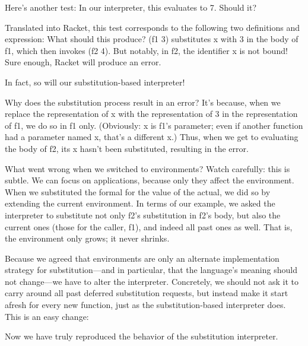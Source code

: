 
Here’s another test:
In our interpreter, this evaluates to 7. Should it?

Translated into Racket, this test corresponds to the following two definitions
and expression:
What should this produce? (f1 3) substitutes x with 3 in the body of f1, which
then invokes (f2 4). But notably, in f2, the identifier x is not bound! Sure
enough, Racket will produce an error.

In fact, so will our substitution-based interpreter!

Why does the substitution process result in an error? It’s because, when we
replace the representation of x with the representation of 3 in the
representation of f1, we do so in f1 only.
(Obviously: x is f1’s parameter; even if another function had a parameter named
x, that’s a different x.) Thus, when we get to evaluating the body of f2, its x
hasn’t been substituted, resulting in the error.

What went wrong when we switched to environments? Watch carefully: this is
subtle. We can focus on applications, because only they affect the environment.
When we substituted the formal for the value of the actual, we did so by
extending the current environment. In terms of our example, we asked the
interpreter to substitute not only f2’s substitution in f2’s body, but also the
current ones (those for the caller, f1), and indeed all past ones as well. That
is, the environment only grows; it never shrinks.

Because we agreed that environments are only an alternate implementation
strategy for substitution—and in particular, that the language’s meaning should
not change—we have to alter the interpreter. Concretely, we should not ask it to
carry around all past deferred substitution requests, but instead make it start
afresh for every new function, just as the substitution-based interpreter does.
This is an easy change:

Now we have truly reproduced the behavior of the substitution interpreter.
